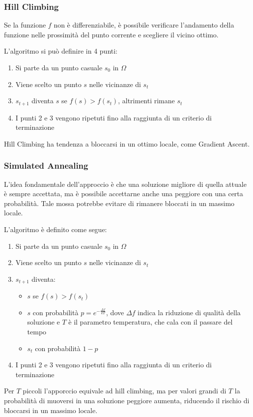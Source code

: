 \documentclass[a4paper]{article}
\begin{document}
\subsubsection{Hill Climbing}
Se la funzione $f$ non è differenziabile, è possibile verificare l'andamento della 
funzione nelle prossimità del punto corrente e scegliere il vicino ottimo.

L'algoritmo si può definire in 4 punti:
\begin{enumerate}
    \item Si parte da un punto casuale $s_0$ in $\Omega$
    \item Viene scelto un punto $s$ nelle vicinanze di $s_t$ 
    \item $s_{t+1}$ diventa $s$ se $f(s) > f(s_t)$, altrimenti rimane $s_t$
    \item I punti 2 e 3 vengono ripetuti fino alla raggiunta di un criterio di terminazione
\end{enumerate}
Hill Climbing ha tendenza a bloccarsi in un ottimo locale, come Gradient Ascent.

\subsubsection{Simulated Annealing}
L'idea fondamentale dell'approccio è che una soluzione migliore di quella 
attuale è sempre accettata, ma è possibile accettarne anche una peggiore 
con una certa probabilità.
Tale mossa potrebbe evitare di rimanere bloccati in un massimo locale.

L'algoritmo è definito come segue:
\begin{enumerate}
    \item Si parte da un punto casuale $s_0$ in $\Omega$
    \item Viene scelto un punto $s$ nelle vicinanze di $s_t$ 
    \item $s_{t+1}$ diventa:
        \begin{itemize}
            \item $s$ se $f(s) > f(s_t)$
            \item $s$ con probabilità $p = e^{-\frac{\Delta f}{kT}}$, dove $\Delta f$ 
            indica la riduzione di qualità della soluzione e $T$ è il parametro temperatura, che
            cala con il passare del tempo
            \item $s_t$ con probabilità $1- p$
        \end{itemize}
    \item I punti 2 e 3 vengono ripetuti fino alla raggiunta di un criterio di terminazione
\end{enumerate}
Per $T$ piccoli l'apporccio equivale ad hill climbing, ma per valori grandi di $T$
la probabilità di muoversi in una soluzione peggiore aumenta, riducendo il rischio di bloccarsi 
in un massimo locale.
\end{document}
